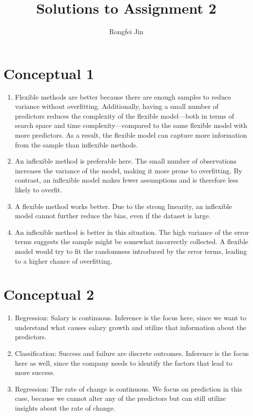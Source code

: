 \documentclass{article}
\title{Solutions to Assignment 2}
\author{Rongfei Jin}
\begin{document}
\maketitle

\section*{Conceptual 1}
\begin{enumerate}[label=(\alph*)]
  \item
        Flexible methods are better because there are enough samples to reduce variance without overfitting. Additionally, having a small number of predictors reduces the complexity of the flexible model—both in terms of search space and time complexity—compared to the same flexible model with more predictors. As a result, the flexible model can capture more information from the sample than inflexible methods.

  \item
        An inflexible method is preferable here. The small number of observations increases the variance of the model, making it more prone to overfitting. By contrast, an inflexible model makes fewer assumptions and is therefore less likely to overfit.

  \item
        A flexible method works better. Due to the strong linearity, an inflexible model cannot further reduce the bias, even if the dataset is large.

  \item
        An inflexible method is better in this situation. The high variance of the error terms suggests the sample might be somewhat incorrectly collected. A flexible model would try to fit the randomness introduced by the error terms, leading to a higher chance of overfitting.

\end{enumerate}
\section*{Conceptual 2}
\begin{enumerate}[label=(\alph*)]

  \item Regression: Salary is continuous. Inference is the focus here, since we want to understand what causes salary growth and utilize that information about the predictors.

  \item Classification: Success and failure are discrete outcomes. Inference is the focus here as well, since the company needs to identify the factors that lead to more success.

  \item Regression: The rate of change is continuous. We focus on prediction in this case, because we cannot alter any of the predictors but can still utilize insights about the rate of change.
\end{enumerate}
\end{document}
